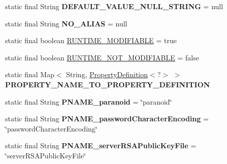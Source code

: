 \begin{DoxyCompactItemize}
static final String {\bfseries D\+E\+F\+A\+U\+L\+T\+\_\+\+V\+A\+L\+U\+E\+\_\+\+N\+U\+L\+L\+\_\+\+S\+T\+R\+I\+NG} = null
\item 
\mbox{\label{classcom_1_1mysql_1_1cj_1_1conf_1_1_property_definitions_ae71e485e663f4e38c8775a0a5ee3ff6d}} 
static final String {\bfseries N\+O\+\_\+\+A\+L\+I\+AS} = null
\item 
static final boolean \mbox{\hyperlink{classcom_1_1mysql_1_1cj_1_1conf_1_1_property_definitions_a78346346b3029e004d85a0682a9c8f10}{R\+U\+N\+T\+I\+M\+E\+\_\+\+M\+O\+D\+I\+F\+I\+A\+B\+LE}} = true
\item 
static final boolean \mbox{\hyperlink{classcom_1_1mysql_1_1cj_1_1conf_1_1_property_definitions_a9b0bc331d96a0d47e581ba734ffd0f50}{R\+U\+N\+T\+I\+M\+E\+\_\+\+N\+O\+T\+\_\+\+M\+O\+D\+I\+F\+I\+A\+B\+LE}} = false
\item 
\mbox{\label{classcom_1_1mysql_1_1cj_1_1conf_1_1_property_definitions_aa23c596973e4a88e6f242831c532566a}} 
static final Map$<$ String, \mbox{\hyperlink{interfacecom_1_1mysql_1_1cj_1_1conf_1_1_property_definition}{Property\+Definition}}$<$?$>$ $>$ {\bfseries P\+R\+O\+P\+E\+R\+T\+Y\+\_\+\+N\+A\+M\+E\+\_\+\+T\+O\+\_\+\+P\+R\+O\+P\+E\+R\+T\+Y\+\_\+\+D\+E\+F\+I\+N\+I\+T\+I\+ON}
\item 
\mbox{\label{classcom_1_1mysql_1_1cj_1_1conf_1_1_property_definitions_a5cafce96f7f835a605fed527dbfa8e91}} 
static final String {\bfseries P\+N\+A\+M\+E\+\_\+paranoid} = \char`\"{}paranoid\char`\"{}
\item 
\mbox{\label{classcom_1_1mysql_1_1cj_1_1conf_1_1_property_definitions_ac6d48c58b889314d10c3086973384fde}} 
static final String {\bfseries P\+N\+A\+M\+E\+\_\+password\+Character\+Encoding} = \char`\"{}password\+Character\+Encoding\char`\"{}
\item 
\mbox{\label{classcom_1_1mysql_1_1cj_1_1conf_1_1_property_definitions_a3c93b8bea3327a086c2ddb066d21af10}} 
static final String {\bfseries P\+N\+A\+M\+E\+\_\+server\+R\+S\+A\+Public\+Key\+File} = \char`\"{}server\+R\+S\+A\+Public\+Key\+File\char`\"{}

\end{DoxyCompactItemize}
